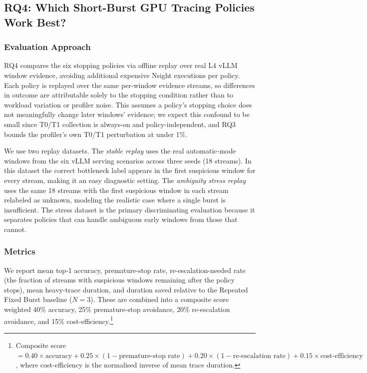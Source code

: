 
\subsection{RQ4: Which Short-Burst GPU Tracing Policies Work Best?}
\label{sec:rq4}

\subsubsection{Evaluation Approach}

RQ4 compares the six stopping policies via offline replay over real L4 vLLM window evidence, avoiding additional expensive Nsight executions per policy. Each policy is replayed over the same per-window evidence streams, so differences in outcome are attributable solely to the stopping condition rather than to workload variation or profiler noise. This assumes a policy's stopping choice does not meaningfully change later windows' evidence; we expect this confound to be small since T0/T1 collection is always-on and policy-independent, and RQ3 bounds the profiler's own T0/T1 perturbation at under 1\%.

We use two replay datasets. The \emph{stable replay} uses the real automatic-mode windows from the six vLLM serving scenarios across three seeds (18 streams). In this dataset the correct bottleneck label appears in the first suspicious window for every stream, making it an easy diagnostic setting. The \emph{ambiguity stress replay} uses the same 18 streams with the first suspicious window in each stream relabeled as unknown, modeling the realistic case where a single burst is insufficient. The stress dataset is the primary discriminating evaluation because it separates policies that can handle ambiguous early windows from those
that cannot.

\subsubsection{Metrics}

We report mean top-1 accuracy, premature-stop rate, re-escalation-needed rate (the fraction of streams with suspicious windows remaining after the policy stops), mean heavy-trace duration, and duration saved relative to the Repeated Fixed Burst baseline ($N=3$). These are combined into a composite score weighted 40\% accuracy, 25\% premature-stop avoidance, 20\% re-escalation avoidance, and 15\% cost-efficiency.\footnote{Composite score $= 0.40 \times \text{accuracy} + 0.25 \times (1 - \text{premature-stop rate}) + 0.20 \times (1 - \text{re-escalation rate}) + 0.15 \times \text{cost-efficiency}$, where cost-efficiency is the normalised inverse of mean trace duration.}

